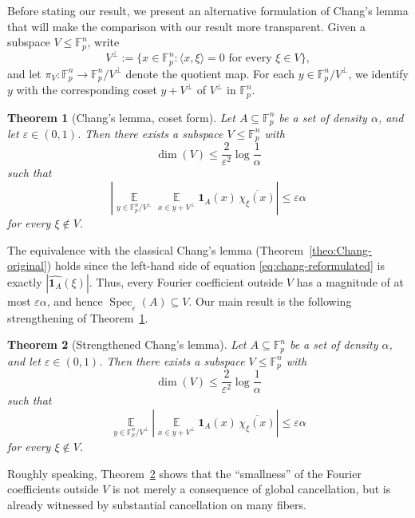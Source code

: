 \documentclass[11pt,reqno]{amsart}
\theoremstyle{plain}
\newtheorem{thm}{Theorem}[section]
\theoremstyle{remark}
\begin{document}
Before stating our result, we present an alternative formulation of Chang’s lemma that will make the comparison with our result more transparent. Given a subspace $V\le \mathbb{F}_p^n$, write
$$
V^\perp:=\{x\in\mathbb{F}_p^n:\langle x,\xi\rangle=0 \text{ for every }\xi\in V\},
$$
and let
$
\pi_V:\mathbb{F}_p^n\to \mathbb{F}_p^n/V^\perp
$
denote the quotient map. For each $y\in \mathbb F_p^n/V^\perp$, we identify $y$
with the corresponding coset $y+V^\perp$ of $V^\perp$ in $\mathbb F_p^n$. 
\begin{thm}[Chang's lemma, coset form]
\label{theo:chang-reformulated}
Let $A\subseteq \mathbb{F}_p^n$ be a set of density $\alpha$, and let $\varepsilon\in(0,1)$.
Then there exists a subspace $V\leq \mathbb{F}_p^n$ with
$$
\dim(V)\leq \frac{2}{\varepsilon^2}\log\frac{1}{\alpha}
$$
such that
\begin{equation}\label{eq:chang-reformulated}
\left|
\mathop{\mathbb E}\limits_{y\in \mathbb F_p^n/V^\perp}
\mathop{\mathbb E}\limits_{x\in y+V^\perp}
\mathbf{1}_A(x)\,\overline{\chi_\xi(x)}
\right|
\le \varepsilon\alpha
\end{equation}
for every $\xi\notin V$.
\end{thm}
The equivalence with the classical Chang's lemma (Theorem~\ref{theo:Chang-original}) holds since the left-hand side of equation \eqref{eq:chang-reformulated} is exactly  $|\widehat{\mathbf 1_A}(\xi)|$. Thus, every Fourier coefficient outside $V$ has a magnitude of at most $\varepsilon\alpha$, and hence $\operatorname{Spec}_\varepsilon(A)\subseteq V$. Our main result is the following strengthening of Theorem~\ref{theo:chang-reformulated}.

\begin{thm}[Strengthened Chang's lemma]\label{theo:main}
Let $A\subseteq \mathbb{F}_p^n$ be a set of density $\alpha$, and let $\varepsilon\in(0,1)$.
Then there exists a subspace $V\le \mathbb{F}_p^n$ with
$$
\dim(V)\le \frac{2}{\varepsilon^2}\log\frac{1}{\alpha}
$$
such that
\begin{equation}\label{eq:refined-chang}
\mathop{\mathbb E}\limits_{y\in \mathbb F_p^n/V^\perp}
\left|
\mathop{\mathbb E}\limits_{x\in y+V^\perp}
\mathbf{1}_A(x)\,\overline{\chi_\xi(x)}
\right|
\le \varepsilon\alpha
\end{equation}
for every $\xi\notin V$.
\end{thm}
Roughly speaking, Theorem~\ref{theo:main} shows that the ``smallness'' of the Fourier coefficients outside $V$ is not merely a consequence of global cancellation, but is already witnessed by substantial cancellation on many fibers. 
\end{document}

